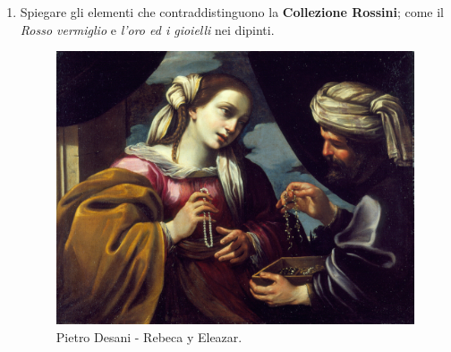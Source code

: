 \documentclass[12pt,a4paper]{article}
\begin{document}
\begin{enumerate}
	\item Spiegare gli elementi che contraddistinguono la \textbf{Collezione Rossini}; come il \textit{Rosso vermiglio} e \textit{l'oro ed i gioielli} nei dipinti.
	\begin{figure}[h]
		\centering
		\includegraphics[scale = 0.05]{Pietro_Desani_Rebeca_y_Eleazar.jpg}
		\caption{Pietro Desani - Rebeca y Eleazar.}
	\end{figure}
	

\end{enumerate}
\end{document}
